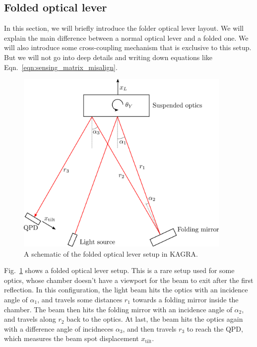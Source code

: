 \subsection{Folded optical lever \label{sec:folded_optical_lever}}
In this section, we will briefly introduce the folder optical lever layout.
We will explain the main difference between a normal optical lever and a folded one.
We will also introduce some cross-coupling mechanism that is exclusive to this setup.
But we will not go into deep details and writing down equations like Eqn.~\eqref{eqn:sensing_matrix_misalign}.
\begin{figure}[!h]
	\centering
	\includegraphics[width=104mm]{figures/folded_optical_lever}
	\caption{A schematic of the folded optical lever setup in KAGRA.}
	\label{fig:foldedopticallever}
\end{figure}
Fig.~\ref{fig:foldedopticallever} shows a folded optical lever setup.
This is a rare setup used for some optics, whose chamber doesn't have a viewport for the beam to exit after the first reflection.
In this configuration, the light beam hits the optics with an incidence angle of $\alpha_1$, and travels some distances $r_1$ towards a folding mirror inside the chamber.
The beam then hits the folding mirror with an incidence angle of $\alpha_2$, and travels along $r_2$ back to the optics.
At last, the beam hits the optics again with a difference angle of incidneces $\alpha_3$, and then travels $r_3$ to reach the QPD, which measures the beam spot displacement $x_\mathrm{tilt}$.

